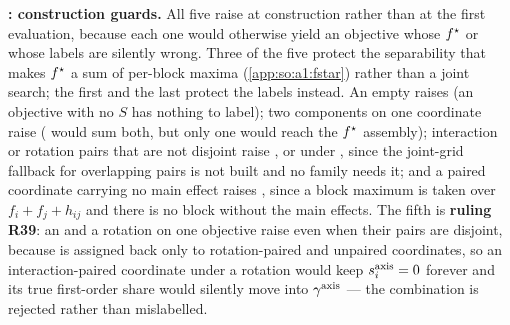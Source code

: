 \textbf{: construction guards.} All five raise at
construction rather than at the first evaluation, because each one would
otherwise yield an objective whose $f^\star$ or whose labels are silently wrong.
Three of the five protect the separability that makes $f^\star$ a sum of
per-block maxima (\ref{app:so:a1:fstar}) rather than a joint search; the first
and the last protect the labels instead. An empty
 raises  (an objective with no $S$ has
nothing to label); two components on one coordinate raise 
( would sum both, but only one would reach the $f^\star$
assembly); interaction or rotation pairs that are not disjoint raise
, or  under
, since the joint-grid fallback for overlapping
pairs is not built and no family needs it; and a paired coordinate carrying no
main effect raises , since a block maximum is taken over
$f_i+f_j+h_{ij}$ and there is no block without the main effects. The fifth is
\textbf{ruling R39}: an  and a rotation on one objective
raise  even when their pairs are disjoint, because
 is assigned back only to rotation-paired and unpaired
coordinates, so an interaction-paired coordinate under a rotation would keep
$s_{i}^{\mathrm{axis}}=0$ forever and its true first-order share would silently move into
$\gamma^{\mathrm{axis}}$ --- the combination is rejected rather than mislabelled.

